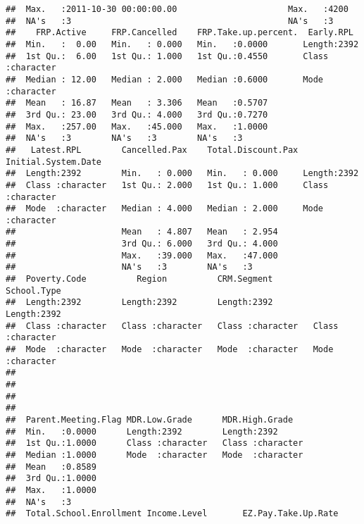 \documentclass[
]{article}
\begin{document}
\begin{verbatim}
##  Max.   :2011-10-30 00:00:00.00                      Max.   :4200  
##  NA's   :3                                           NA's   :3     
##    FRP.Active     FRP.Cancelled    FRP.Take.up.percent.  Early.RPL        
##  Min.   :  0.00   Min.   : 0.000   Min.   :0.0000       Length:2392       
##  1st Qu.:  6.00   1st Qu.: 1.000   1st Qu.:0.4550       Class :character  
##  Median : 12.00   Median : 2.000   Median :0.6000       Mode  :character  
##  Mean   : 16.87   Mean   : 3.306   Mean   :0.5707                         
##  3rd Qu.: 23.00   3rd Qu.: 4.000   3rd Qu.:0.7270                         
##  Max.   :257.00   Max.   :45.000   Max.   :1.0000                         
##  NA's   :3        NA's   :3        NA's   :3                              
##   Latest.RPL        Cancelled.Pax    Total.Discount.Pax Initial.System.Date
##  Length:2392        Min.   : 0.000   Min.   : 0.000     Length:2392        
##  Class :character   1st Qu.: 2.000   1st Qu.: 1.000     Class :character   
##  Mode  :character   Median : 4.000   Median : 2.000     Mode  :character   
##                     Mean   : 4.807   Mean   : 2.954                        
##                     3rd Qu.: 6.000   3rd Qu.: 4.000                        
##                     Max.   :39.000   Max.   :47.000                        
##                     NA's   :3        NA's   :3                             
##  Poverty.Code          Region          CRM.Segment        School.Type       
##  Length:2392        Length:2392        Length:2392        Length:2392       
##  Class :character   Class :character   Class :character   Class :character  
##  Mode  :character   Mode  :character   Mode  :character   Mode  :character  
##                                                                             
##                                                                             
##                                                                             
##                                                                             
##  Parent.Meeting.Flag MDR.Low.Grade      MDR.High.Grade    
##  Min.   :0.0000      Length:2392        Length:2392       
##  1st Qu.:1.0000      Class :character   Class :character  
##  Median :1.0000      Mode  :character   Mode  :character  
##  Mean   :0.8589                                           
##  3rd Qu.:1.0000                                           
##  Max.   :1.0000                                           
##  NA's   :3                                                
##  Total.School.Enrollment Income.Level       EZ.Pay.Take.Up.Rate

\end{verbatim}
\end{document}
